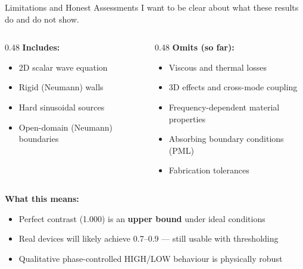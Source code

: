 \documentclass[aspectratio=169,11pt]{beamer}
\begin{document}
\begin{frame}{Limitations and Honest Assessments}
  I want to be clear about what these results do and do not show.

  \begin{columns}[T]
    \begin{column}{0.48\textwidth}
      \footnotesize
      \textbf{Includes:}
      \begin{itemize}
        \item 2D scalar wave equation
        \item Rigid (Neumann) walls
        \item Hard sinusoidal sources
        \item Open-domain (Neumann) boundaries
      \end{itemize}
    \end{column}
    \begin{column}{0.48\textwidth}
      \footnotesize
      \textbf{Omits (so far):}
      \begin{itemize}
        \item Viscous and thermal losses
        \item 3D effects and cross-mode coupling
        \item Frequency-dependent material properties
        \item Absorbing boundary conditions (PML)
        \item Fabrication tolerances
      \end{itemize}
    \end{column}
  \end{columns}

  \vspace{0.1cm}
  \footnotesize
  \textbf{What this means:}
  \begin{itemize}
    \item Perfect contrast (1.000) is an \textbf{upper bound} under ideal conditions
    \item Real devices will likely achieve 0.7--0.9 --- still usable with thresholding
    \item Qualitative phase-controlled HIGH/LOW behaviour is physically robust
  \end{itemize}
\end{frame}
\end{document}

